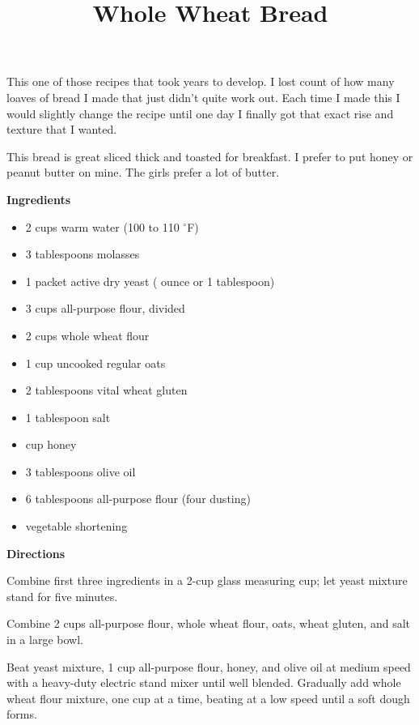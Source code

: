 \documentclass{article}
\title{Whole Wheat Bread}
\begin{document}
This one of those recipes that took years to develop. I lost count of how many
loaves of bread I made that just didn't quite work out. Each time I made this I
would slightly change the recipe until one day I finally got that exact rise
and texture that I wanted.

This bread is great sliced thick and toasted for breakfast. I prefer to put honey
or peanut butter on mine. The girls prefer a lot of butter.

\bigskip

\bigskip

\begin{multicols}{2}
      \textbf{Ingredients}

      \begin{itemize}
            \item 2 cups warm water (100 to 110 $^{\circ}$F)
            \item 3 tablespoons molasses
            \item 1 packet active dry yeast ( ounce or 1 tablespoon)
            \item 3 cups all-purpose flour, divided
            \item 2 cups whole wheat flour
            \item 1 cup uncooked regular oats
            \item 2 tablespoons vital wheat gluten
            \item 1 tablespoon salt
            \item {} cup honey
            \item 3 tablespoons olive oil
            \item 6 tablespoons all-purpose flour (four dusting)
            \item vegetable shortening
      \end{itemize}

      \bigskip

      \textbf{Directions}

      Combine first three ingredients in a 2-cup glass measuring cup; let yeast
      mixture stand for five minutes.
      \medskip

      Combine 2 cups all-purpose flour, whole wheat flour, oats, wheat gluten, and salt in a large bowl.
      \medskip

      Beat yeast mixture, 1 cup all-purpose flour, honey, and olive oil at medium speed with
      a heavy-duty electric stand mixer until well blended. Gradually add whole wheat flour
      mixture, one cup at a time, beating at a low speed until a soft dough forms.
      \medskip


\end{multicols}
\end{document}
